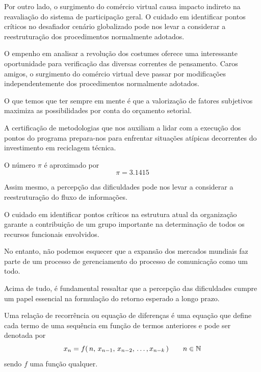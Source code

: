 \documentclass[fleqn]{profmat-cefet}
\begin{document}
Por outro lado, o surgimento do comércio virtual causa impacto indireto na 
reavaliação do sistema de participação geral. O cuidado em identificar pontos 
críticos no desafiador cenário globalizado pode nos levar a considerar a 
reestruturação dos procedimentos normalmente adotados. 

\begin{axioma}
  O empenho em analisar a revolução dos costumes oferece uma interessante
  oportunidade para verificação das diversas correntes de pensamento. Caros
  amigos, o surgimento do comércio virtual deve passar por modificações
  independentemente dos procedimentos normalmente adotados.
\end{axioma}

\begin{axioma}
  O que temos que ter sempre em mente é que a valorização de fatores subjetivos
  maximiza as possibilidades por conta do orçamento setorial.
\end{axioma}

A certificação de metodologias que nos auxiliam a lidar com a execução dos
pontos do programa prepara-nos para enfrentar situações atípicas decorrentes do
investimento em reciclagem técnica.

\begin{definicao}[O número $\pi$] O número $\pi$ é aproximado por 
  \[\pi = 3.1415\]
\end{definicao}

Assim mesmo, a percepção das dificuldades pode nos levar a considerar a
reestruturação do fluxo de informações.

\begin{definicao}
  O cuidado em identificar pontos críticos na estrutura atual da organização
  garante a contribuição de um grupo importante na determinação de todos os
  recursos funcionais envolvidos.
\end{definicao}

\begin{lema}
  No entanto, não podemos esquecer que a expansão dos mercados mundiais faz
  parte de um processo de gerenciamento do processo de comunicação como um todo.
\end{lema}

\begin{lema}
  Acima de tudo, é fundamental ressaltar que a percepção das dificuldades cumpre
  um papel essencial na formulação do retorno esperado a longo prazo.
\end{lema}

\begin{definicao}
    Uma relação de recorrência ou equação de diferenças é uma equação
    que define cada termo de uma sequência em função de termos anteriores e pode
    ser denotada por
    \begin{equation}
        \label{defi_rr} 
        x_n = f(\, n,\, x_{n-1},\, x_{n-2},\, \dots, x_{n-k} \,) \qquad n\in\mathbb{N} 
    \end{equation}
    sendo $f$ uma função qualquer.
\end{definicao}
\end{document}
